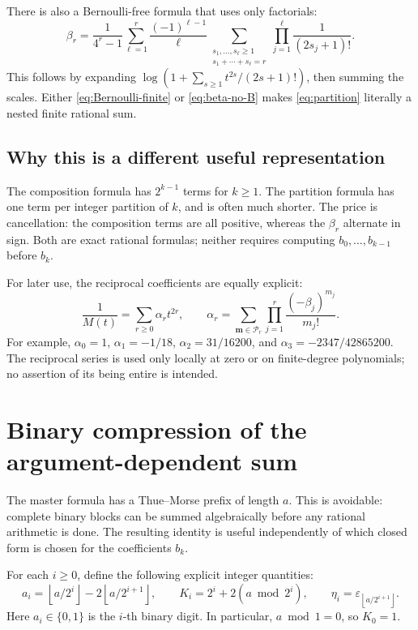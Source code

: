 \documentclass[11pt,a4paper]{article}
\theoremstyle{definition}
\theoremstyle{remark}
\newcommand{\eps}{\varepsilon}
\newcommand{\Part}{\mathcal P}
\newcommand{\floor}[1]{\left\lfloor #1\right\rfloor}
\begin{document}
There is also a Bernoulli-free formula that uses only factorials:
\begin{equation}
 \boxed{\displaystyle
 \beta_r=\frac1{4^r-1}
 \sum_{\ell=1}^{r}\frac{(-1)^{\ell-1}}{\ell}
 \sum_{\substack{s_1,\ldots,s_\ell\geq1\\s_1+\cdots+s_\ell=r}}
       \prod_{j=1}^{\ell}\frac1{(2s_j+1)!}.}             \label{eq:beta-no-B}
\end{equation}
This follows by expanding
\(\log(1+\sum_{s\geq1}t^{2s}/(2s+1)!)\), then summing the scales.
Either \eqref{eq:Bernoulli-finite} or \eqref{eq:beta-no-B} makes
\eqref{eq:partition} literally a nested finite rational sum.

\subsection{Why this is a different useful representation}
The composition formula has \(2^{k-1}\) terms for \(k\geq1\).
The partition formula has one term per integer partition of \(k\), and is often
much shorter.  The price is cancellation: the composition terms are all positive,
whereas the \(\beta_r\) alternate in sign.  Both are exact rational formulas; neither
requires computing \(b_0,\ldots,b_{k-1}\) before \(b_k\).

For later use, the reciprocal coefficients are equally explicit:
\begin{equation}
 \frac1{M(t)}=\sum_{r\geq0}\alpha_r t^{2r},\qquad
 \alpha_r=\sum_{\mathbf m\in\Part_r}
               \prod_{j=1}^{r}\frac{(-\beta_j)^{m_j}}{m_j!}.
                                                               \label{eq:alpha}
\end{equation}
For example, \(\alpha_0=1\), \(\alpha_1=-1/18\),
\(\alpha_2=31/16200\), and \(\alpha_3=-2347/42865200\).
The reciprocal series is used only locally at zero or on finite-degree
polynomials; no assertion of its being entire is intended.

\section{Binary compression of the argument-dependent sum}
\label{sec:binary}
The master formula has a Thue--Morse prefix of length \(a\).  This is avoidable:
complete binary blocks can be summed algebraically before any rational arithmetic
is done.  The resulting identity is useful independently of which closed form is
chosen for the coefficients \(b_k\).

For each \(i\geq0\), define the following explicit integer quantities:
\begin{equation}
 a_i=\floor{a/2^i}-2\floor{a/2^{i+1}},\qquad
 K_i=2^i+2(a\bmod 2^i),\qquad
 \eta_i=\eps_{\floor{a/2^{i+1}}}.                         \label{eq:bit-data}
\end{equation}
Here \(a_i\in\{0,1\}\) is the \(i\)-th binary digit.  In particular,
\(a\bmod1=0\), so \(K_0=1\).
\end{document}
